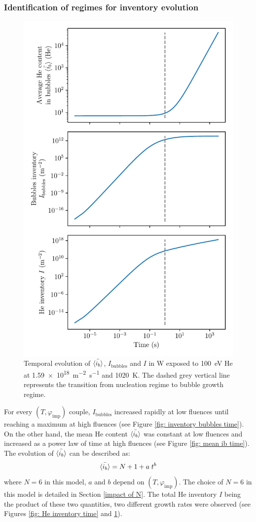 \subsubsection{Identification of regimes for inventory evolution} \label{nucleation growth phases}

\begin{figure} [h]
    \centering
    \includegraphics[width=0.75\linewidth]{Figures/Chapter4/parametric study/inventory_bubbles_ib.pdf}
    \caption{Temporal evolution of $\Bar{\langle i_b \rangle}$, $I_\mathrm{bubbles}$ and $I$ in W exposed to \SI{100}{eV} He at \SI{1.59e18}{m^{-2}.s^{-1}} and \SI{1020}{K}. The dashed grey vertical line represents the transition from nucleation regime to bubble growth regime.}
    \label{fig:two regimes}
\end{figure}

For every $(T, \varphi_\mathrm{imp})$ couple, $I_\mathrm{bubbles}$ increased rapidly at low fluences until reaching a maximum at high fluences (see Figure \ref{fig: inventory bubbles time}).
On the other hand, the mean He content $\Bar{\langle i_b \rangle}$ was constant at low fluences and increased as a power law of time at high fluences (see Figure \ref{fig: mean ib time}).
The evolution of $\Bar{\langle i_b \rangle}$ can be described as:
\begin{equation}
    \Bar{\langle i_b \rangle} = N + 1 + a \; t^b
    \label{eq: ib evolution}
\end{equation}
where $N=6$ in this model, $a$ and $b$ depend on $(T, \varphi_\mathrm{imp})$.
The choice of $N=6$ in this model is detailed in Section \ref{impact of N}.
The total He inventory $I$ being the product of these two quantities, two different growth rates were observed (see Figures \ref{fig: He inventory time} and \ref{fig:two regimes}).

